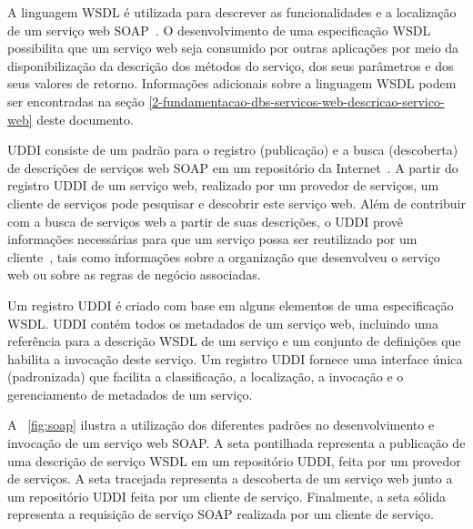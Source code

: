 A linguagem WSDL é utilizada para descrever as funcionalidades e a localização de um serviço web SOAP~\cite{W3C-2007-WSDL}. O desenvolvimento de uma especificação WSDL possibilita que um serviço web seja consumido por outras aplicações por meio da disponibilização da descrição dos métodos do serviço, dos seus parâmetros e dos seus valores de retorno. Informações adicionais sobre a linguagem WSDL podem ser encontradas na seção \ref{2-fundamentacao-dbs-servicos-web-descricao-servico-web} deste documento.

UDDI consiste de um padrão para o registro (publicação) e a busca (descoberta) de descrições de serviços web SOAP em um repositório da Internet~\cite{PAPAZOGLOU-GEORGAKOPOULOS-2003-Service-Oriented-Computing, OASIS-2004-UDDI}. A partir do registro UDDI de um serviço web, realizado por um provedor de serviços, um cliente de serviços pode pesquisar e descobrir este serviço web. Além de contribuir com a busca de serviços web a partir de suas descrições, o UDDI provê informações necessárias para que um serviço possa ser reutilizado por um cliente~\cite{OASIS-2004-UDDI}, tais como informações sobre a organização que desenvolveu o serviço web ou sobre as regras de negócio associadas.

Um registro UDDI é criado com base em alguns elementos de uma especificação WSDL. UDDI contém todos os metadados de um serviço web, incluindo uma referência para a descrição WSDL de um serviço e um conjunto de definições que habilita a invocação deste serviço. Um registro UDDI fornece uma interface única (padronizada) que facilita a classificação, a localização, a invocação e o gerenciamento de metadados de um serviço.


A \figurename~\ref{fig:soap} ilustra a utilização dos diferentes padrões no desenvolvimento e invocação de um serviço web SOAP. A seta pontilhada representa a publicação de uma descrição de serviço WSDL em um repositório UDDI, feita por um provedor de serviços. A seta tracejada representa a descoberta de um serviço web junto a um repositório UDDI feita por um cliente de serviço. Finalmente, a seta sólida representa a requisição de serviço SOAP realizada por um cliente de serviço.


